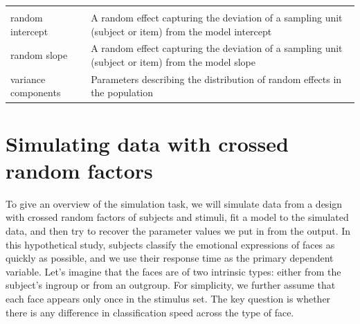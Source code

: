 \documentclass[doc,floatsintext]{apa6}
\begin{document}
\begin{tcolorbox}[colback=black!5!white,colframe=white!5!black,title=Box 1. Glossary of terms]
\begin{longtable}[]{@{}ll@{}}
\begin{minipage}[t]{0.65\columnwidth}
\end{minipage}\tabularnewline
\begin{minipage}[t]{0.29\columnwidth}\raggedright
random intercept\strut
\end{minipage} & \begin{minipage}[t]{0.65\columnwidth}\raggedright
A random effect capturing the deviation of a sampling unit (subject or item) from the model intercept\strut
\end{minipage}\tabularnewline
\begin{minipage}[t]{0.29\columnwidth}\raggedright
random slope\strut
\end{minipage} & \begin{minipage}[t]{0.65\columnwidth}\raggedright
A random effect capturing the deviation of a sampling unit (subject or item) from the model slope\strut
\end{minipage}\tabularnewline
\begin{minipage}[t]{0.29\columnwidth}\raggedright
variance components\strut
\end{minipage} & \begin{minipage}[t]{0.65\columnwidth}\raggedright
Parameters describing the distribution of random effects in the
population\strut
\end{minipage}\tabularnewline
\end{longtable}
\end{tcolorbox}

\hypertarget{simulating-data-with-crossed-random-factors}{%
\section{Simulating data with crossed random factors}\label{simulating-data-with-crossed-random-factors}}

To give an overview of the simulation task, we will simulate data from a design with crossed random factors of subjects and stimuli, fit a model to the simulated data, and then try to recover the parameter values we put in from the output. In this hypothetical study, subjects classify the emotional expressions of faces as quickly as possible, and we use their response time as the primary dependent variable. Let's imagine that the faces are of two intrinsic types: either from the subject's ingroup or from an outgroup. For simplicity, we further assume that each face appears only once in the stimulus set. The key question is whether there is any difference in classification speed across the type of face.
\end{document}
